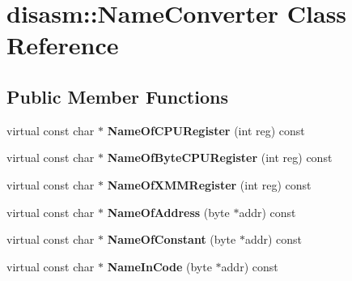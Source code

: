 \hypertarget{classdisasm_1_1_name_converter}{}\section{disasm\+:\+:Name\+Converter Class Reference}
\label{classdisasm_1_1_name_converter}
\subsection*{Public Member Functions}
\begin{DoxyCompactItemize}
\item 
\hypertarget{classdisasm_1_1_name_converter_a3fc19f588af734134e834552d784a199}{}virtual const char $\ast$ {\bfseries Name\+Of\+C\+P\+U\+Register} (int reg) const \label{classdisasm_1_1_name_converter_a3fc19f588af734134e834552d784a199}

\item 
\hypertarget{classdisasm_1_1_name_converter_af247198c0ee8b74827b7890f2169a79e}{}virtual const char $\ast$ {\bfseries Name\+Of\+Byte\+C\+P\+U\+Register} (int reg) const \label{classdisasm_1_1_name_converter_af247198c0ee8b74827b7890f2169a79e}

\item 
\hypertarget{classdisasm_1_1_name_converter_a0415862f7e0bb0521db4ab87a1d95f82}{}virtual const char $\ast$ {\bfseries Name\+Of\+X\+M\+M\+Register} (int reg) const \label{classdisasm_1_1_name_converter_a0415862f7e0bb0521db4ab87a1d95f82}

\item 
\hypertarget{classdisasm_1_1_name_converter_afb0e08d2922c58819a1556fee4c65f62}{}virtual const char $\ast$ {\bfseries Name\+Of\+Address} (byte $\ast$addr) const \label{classdisasm_1_1_name_converter_afb0e08d2922c58819a1556fee4c65f62}

\item 
\hypertarget{classdisasm_1_1_name_converter_ae948c7e902b984ca7f25d12d4fb84edf}{}virtual const char $\ast$ {\bfseries Name\+Of\+Constant} (byte $\ast$addr) const \label{classdisasm_1_1_name_converter_ae948c7e902b984ca7f25d12d4fb84edf}

\item 
\hypertarget{classdisasm_1_1_name_converter_a73abd2795d841ff0eaa4149a787876e1}{}virtual const char $\ast$ {\bfseries Name\+In\+Code} (byte $\ast$addr) const \label{classdisasm_1_1_name_converter_a73abd2795d841ff0eaa4149a787876e1}

\end{DoxyCompactItemize}
